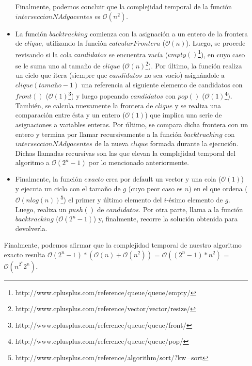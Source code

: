 \begin{itemize}
\newline
Finalmente, podemos concluir que la complejidad temporal de la función $interseccionNAdyacentes$ es $\mathcal{O}(n^2)$.
\item La función $backtracking$ comienza con la asignación a un entero de la frontera de $clique$, utilizando la función $calcularFrontera$ ($\mathcal{O}(n)$).\newline
\newline
Luego, se procede revisando si la cola $candidatos$ se encuentra vacía ($empty()$\footnote{http://www.cplusplus.com/reference/queue/queue/empty/}), en cuyo caso se le suma uno al tamaño de $clique$ ($\mathcal{O}(n)$\footnote{http://www.cplusplus.com/reference/vector/vector/resize/}).\newline
\newline
Por último, la función realiza un ciclo que itera (siempre que $candidatos$ no sea vacío) asignándole a $clique(tamaño-1)$ una referencia al siguiente elemento de candidatos con $front()$ ($\mathcal{O}(1)$\footnote{http://www.cplusplus.com/reference/queue/queue/front/}) y luego popeando $candidatos$ con $pop()$ ($\mathcal{O}(1)$\footnote{http://www.cplusplus.com/reference/queue/queue/pop/}). También, se calcula nuevamente la frontera de $clique$ y se realiza una comparación entre ésta y un entero ($\mathcal{O}(1)$) que implica una serie de asignaciones a variables enteras. Por último, se compara dicha frontera con un entero y termina por llamar recursivamente a la función $backtracking$ con $interseccionNAdyacentes$ de la nueva $clique$ formada durante la ejecución. Dichas llamadas recursivas son las que elevan la complejidad temporal del algoritmo a $\mathcal{O}(2^n - 1)$ por lo mencionado anteriormente.
\item Finalmente, la función $exacto$ crea por default un vector y una cola ($\mathcal{O}(1)$) y ejecuta un ciclo con el tamaño de $g$ (cuyo peor caso es $n$) en el que ordena ($\mathcal{O}(nlog(n))$\footnote{http://www.cplusplus.com/reference/algorithm/sort/?kw=sort})
el primer y último elemento del $i$-ésimo elemento de $g$. Luego, realiza un $push()$ de $candidatos$.\newline
\newline
Por otra parte, llama a la función $backtracking$ ($\mathcal{O}(2^n - 1)$) y, finalmente, recorre la solución obtenida para devolverla.
\end{itemize}

Finalmente, podemos afirmar que la complejidad temporal de nuestro algoritmo exacto resulta $\mathcal{O}(2^n - 1) * (\mathcal{O}(n) + \mathcal{O}(n^2))$ = $\mathcal{O}((2^n - 1) * n^{2})$ = $\mathcal{O}(n^{2}^*2^n)$.

